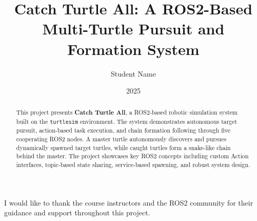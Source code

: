 \documentclass[msc]{abdnthesis}
\title{Catch Turtle All: A ROS2-Based Multi-Turtle Pursuit and Formation System}
\author{Student Name}
\date{2025}
\begin{document}
\maketitle
\makedeclaration

\begin{abstract}
This project presents \textbf{Catch Turtle All}, a ROS2-based robotic simulation system built on the \texttt{turtlesim} environment. The system demonstrates autonomous target pursuit, action-based task execution, and chain formation following through five cooperating ROS2 nodes. A master turtle autonomously discovers and pursues dynamically spawned target turtles, while caught turtles form a snake-like chain behind the master. The project showcases key ROS2 concepts including custom Action interfaces, topic-based state sharing, service-based spawning, and robust system design.
\end{abstract}

\begin{acknowledgements}
I would like to thank the course instructors and the ROS2 community for their guidance and support throughout this project.
\end{acknowledgements}

\tableofcontents



\end{document}
